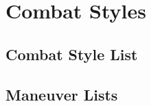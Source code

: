 \chapter{Combat Styles}\label{Combat Styles}

\section{Combat Style List}\label{Combat Style List}

    

\newpage
\section{Maneuver Lists}\label{Maneuver Lists}

    


